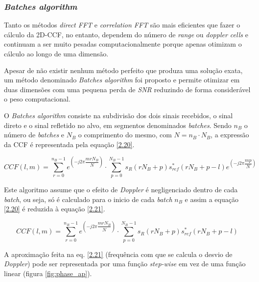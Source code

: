 \subsubsection*{\textit{Batches algorithm}}
Tanto os métodos \textit{direct FFT} e \textit{correlation FFT} são mais eficientes que fazer o cálculo da \gls{2D-CCF}, no entanto, dependem do número de \textit{range} ou \textit{doppler cells} e continuam a ser muito pesadas computacionalmente porque apenas otimizam o cálculo ao longo de uma dimensão.\par 
Apesar de não existir nenhum método perfeito que produza uma solução exata, um método denominado \textit{Batches algorithm} foi proposto e permite otimizar em duas dimensões com uma pequena perda de \textit{\gls{SNR}} reduzindo de forma considerável o peso computacional.\par
O \textit{Batches algorithm} consiste na subdivisão dos dois sinais recebidos, o sinal direto e o sinal refletido no alvo, em segmentos denominados \textit{batches}. Sendo $n_{B}$ o número de \textit{batches} e $N_{B}$ o comprimento do mesmo, com $N=n_{B}\cdot N_{B}$, a expressão da \gls{CCF} é representada pela equação \ref{2.20}.

\begin{equation} \label{2.20}
CCF\left( l,m\right)=\sum_{r=0}^{n_{B}-1}e^{\left( -j2\pi \dfrac{mrN_{B}}{N}\right)}\cdot \sum_{p=0}^{N_{B}-1}s_{R}\left( rN_{B}+p\right)s_{ref}^{\ast}\left( rN_{B}+p-l\right) e^{\left( -j2\pi \dfrac{mp}{N}\right)}   
\end{equation}

Este algoritmo assume que o efeito de \textit{Doppler} é negligenciado dentro de cada \textit{batch}, ou seja, só é calculado para o inicio de cada \textit{batch} $n_{B}$ e assim a equação \ref{2.20} é reduzida à equação \ref{2.21}.

\begin{equation} \label{2.21}
CCF\left( l,m\right)=\sum_{r=0}^{n_{B}-1}e^{\left( -j2\pi \dfrac{mrN_{B}}{N}\right)}\cdot \sum_{p=0}^{N_{B}-1}s_{R}\left( rN_{B}+p\right)s_{ref}^{\ast}\left( rN_{B}+p-l\right)
\end{equation}

A aproximação feita na eq. \ref{2.21} (frequência com que se calcula o desvio de \textit{Doppler}) pode ser representada por uma função \textit{step-wise} em vez de uma função linear (figura \ref{fig:phase_ap}).

